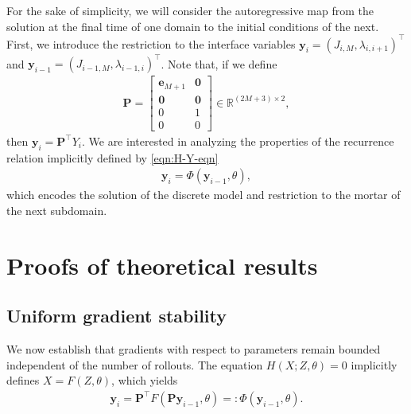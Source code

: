 \documentclass[12pt]{article}
\begin{document}
For the sake of simplicity, we will consider the autoregressive map from the solution at the final time of one domain to the initial conditions of the next. First, we introduce the restriction to the interface variables $\bm{y}_i = (J_{i,M}, \lambda_{i,i+1})^\intercal$ and $\bm{y}_{i-1} = ( J_{i-1,M}, \lambda_{i-1,i})^\intercal$.  Note that, if we define 
\begin{align*}
	\mathbf{P} = 
	\begin{bmatrix}
		\mathbf{e}_{M+1} & \mathbf{0} \\
		\mathbf{0}  & \mathbf{0}  \\
		0  & 1  \\
		0  & 0 
	\end{bmatrix} 
	\in \mathbb{R}^{(2M+3) \times 2},
\end{align*}
then $\bm{y}_i = \mathbf{P}^{\intercal}Y_i$.  We are interested in analyzing the properties of the recurrence relation implicitly defined by \eqref{eqn:H-Y-eqn}
\begin{align*}
	\bm{y}_i = \Phi(\bm{y}_{i-1}, \theta),
\end{align*}
which encodes the solution of the discrete model and restriction to the mortar of the next subdomain.

\section{Proofs of theoretical results}
\label{app:proofs}

\subsection{Uniform gradient stability}
We now establish that gradients with respect to parameters remain bounded independent of the number of rollouts. The equation $H(X; Z, \theta) = 0$ implicitly defines $X = F(Z, \theta)$, which yields
\begin{align*}
	\bm{y}_i = \mathbf{P}^{\intercal}F(\mathbf{P}\bm{y}_{i-1}, \theta) =: \Phi(\bm{y}_{i-1}, \theta).
\end{align*}
\end{document}
